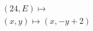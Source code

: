 \documentclass[preview]{standalone}
\begin{document}
\begin{align*}
&(24,E) \mapsto \\& (x,y) \mapsto (x, -y + 2)
\end{align*}
\end{document}

